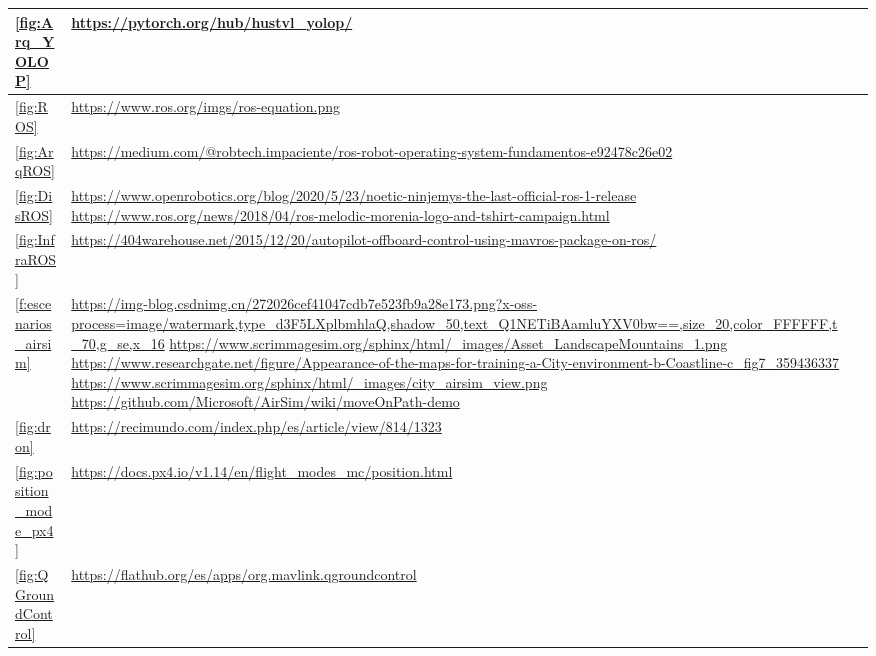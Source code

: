 \begin{tabular}{ | m{4cm} | m{10cm}| m{1cm} | }

    \hline
    \ref{fig:Arq_YOLOP} & \url{https://pytorch.org/hub/hustvl_yolop/} \\
    \hline
    \ref{fig:ROS} & \url{https://www.ros.org/imgs/ros-equation.png} \\
    \hline
    \ref{fig:ArqROS} & \url{https://medium.com/@robtech.impaciente/ros-robot-operating-system-fundamentos-e92478c26e02} \\
    \hline
    \ref{fig:DisROS} & \url{https://www.openrobotics.org/blog/2020/5/23/noetic-ninjemys-the-last-official-ros-1-release} \newline
    \url{https://www.ros.org/news/2018/04/ros-melodic-morenia-logo-and-tshirt-campaign.html}\\
    \hline
    \ref{fig:InfraROS} & \url{https://404warehouse.net/2015/12/20/autopilot-offboard-control-using-mavros-package-on-ros/} \\
    \hline
    \ref{f:escenarios_airsim} & \url{https://img-blog.csdnimg.cn/272026cef41047cdb7e523fb9a28e173.png?x-oss-process=image/watermark,type_d3F5LXplbmhlaQ,shadow_50,text_Q1NETiBAamluYXV0bw==,size_20,color_FFFFFF,t_70,g_se,x_16} \newline
    \url{https://www.scrimmagesim.org/sphinx/html/_images/Asset_LandscapeMountains_1.png} \newline
    \url{https://www.researchgate.net/figure/Appearance-of-the-maps-for-training-a-City-environment-b-Coastline-c_fig7_359436337} \newline
    \url{https://www.scrimmagesim.org/sphinx/html/_images/city_airsim_view.png} \newline
    \url{https://github.com/Microsoft/AirSim/wiki/moveOnPath-demo} \\
    \hline
    \ref{fig:dron} & \url{https://recimundo.com/index.php/es/article/view/814/1323} \\
    \hline
    \ref{fig:position_mode_px4} & \url{https://docs.px4.io/v1.14/en/flight_modes_mc/position.html} \\
    \hline
    \ref{fig:QGroundControl} & \url{https://flathub.org/es/apps/org.mavlink.qgroundcontrol} \\
    \hline

\end{tabular}




